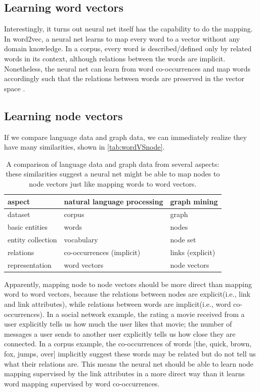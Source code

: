 \documentclass{article}
\begin{document}
\subsection{Learning word vectors}
Interestingly, it turns out neural net itself has the capability to do the 
mapping.
In word2vec, a neural net learns to map every word to a vector without any 
domain knowledge. In a corpus, every word is described/defined only by related 
words in its context, although relations between the words are implicit. 
Nonetheless, the neural net can learn from word co-occurrences and map words 
accordingly such that the relations between words are preserved in the vector 
space \cite{mikolov2013distributed}.

\subsection{Learning node vectors}

If we compare language data and graph data, we can immediately realize they 
have many similarities, shown in \autoref{tab:wordVSnode}.
\begin{table}[H]
	\centering
	\begin{tabularx}{\textwidth}{ |X|X|X| } \hline
		aspect  & natural language processing & graph mining \\ \hline
		dataset & corpus & graph \\ \hline
		basic entities & words & nodes \\ \hline
		entity collection & vocabulary & node set \\ \hline
		relations & co-occurrences (implicit) & links (explicit) \\ \hline
		representation & word vectors & node vectors \\ \hline
	\end{tabularx}
	\caption{A comparison of language data and graph data from 
		several aspects: these similarities suggest a neural net might be able 
		to map nodes to node vectors just like mapping words to word vectors.}
	\label{tab:wordVSnode}
\end{table}
Apparently, mapping node to node vectors should be more direct than mapping 
word to word vectors, because the relations between nodes are explicit(i.e., 
link and link attributes), while relations between words are implicit(i.e., 
word co-occurrences). In a social network example, the rating a movie received 
from a user explicitly tells us how much the user likes that movie; the number 
of messages a user sends to another user explicitly tells us how close they are 
connected. In a corpus example, the co-occurrences of words [the, quick, brown, 
fox, jumps, over] implicitly suggest these words may be related but do not tell 
us what their relations are. This means the neural net should be able to learn 
node mapping supervised by the link attributes in a more direct way than it 
learns word mapping supervised by word co-occurrences.
\end{document}
